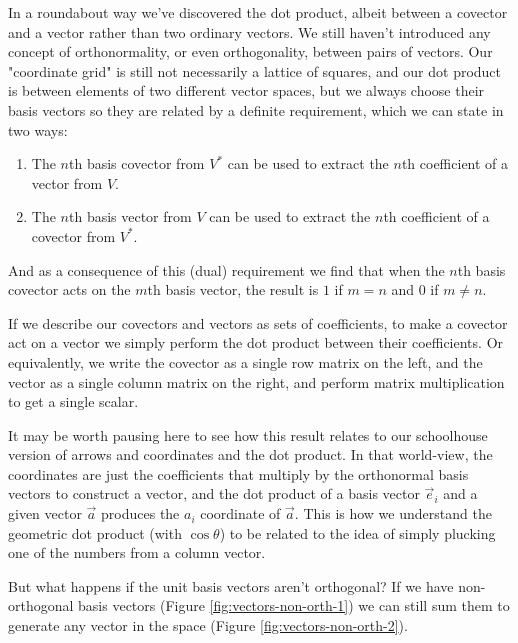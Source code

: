 In a roundabout way we've discovered the dot product, albeit between a covector and a vector rather than two ordinary vectors. We still haven't introduced any concept of orthonormality, or even orthogonality, between pairs of vectors. Our "coordinate grid" is still not necessarily a lattice of squares, and our dot product is between elements of two different vector spaces, but we always choose their basis vectors so they are related by a definite requirement, which we can state in two ways:

\begin{enumerate}
    \item The $n$th basis covector from $V^*$ can be used to extract the $n$th coefficient of a vector from $V$.
    \item The $n$th basis vector from $V$ can be used to extract the $n$th coefficient of a covector from $V^*$.
\end{enumerate}

And as a consequence of this (dual) requirement we find that when the $n$th basis covector acts on the $m$th basis vector, the result is $1$ if $m = n$ and $0$ if $m \ne n$.

If we describe our covectors and vectors as sets of coefficients, to make a covector act on a vector we simply perform the dot product between their coefficients. Or equivalently, we write the covector as a single row matrix on the left, and the vector as a single column matrix on the right, and perform matrix multiplication to get a single scalar.

It may be worth pausing here to see how this result relates to our schoolhouse version of arrows and coordinates and the dot product. In that world-view, the coordinates are just the coefficients that multiply by the orthonormal basis vectors to construct a vector, and the dot product of a basis vector $\vec{e}_i$ and a given vector $\vec{a}$ produces the $a_i$ coordinate of $\vec{a}$. This is how we understand the geometric dot product (with $\cos \theta$) to be related to the idea of simply plucking one of the numbers from a column vector.

But what happens if the unit basis vectors aren't orthogonal? If we have non-orthogonal basis vectors (Figure \ref{fig:vectors-non-orth-1}) we can still sum them to generate any vector in the space (Figure \ref{fig:vectors-non-orth-2}).

